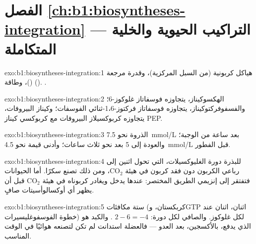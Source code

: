 \section*{الفصل \ref{ch:b1:biosyntheses-integration} --- التراكيب الحيوية والخلية المتكاملة}

\begin{solution}{exo:b1:biosyntheses-integration:1}
هياكل كربونية (من السبل المركزية)، وقدرة مرجعة ()، وطاقة ().
.
\end{solution}

\begin{solution}{exo:b1:biosyntheses-integration:2}
الهكسوكيناز، يتجاوزه فوسفاتاز غلوكوز-6؛ والفسفوفركتوكيناز، يتجاوزه
فوسفاتاز فركتوز-1،6-ثنائي الفوسفات؛ وكيناز البيروفات، يتجاوزه
كربوكسيلاز البيروفات مع كربوكسي كيناز PEP.
\end{solution}

\begin{solution}{exo:b1:biosyntheses-integration:3}
الذروة نحو \qty{7.5}{mmol/L} بعد ساعة من الوجبة؛ والعودة إلى
\qty{5}{} بعد نحو ثلاث ساعات؛ وأدنى قيمة نحو \qty{4.5}{mmol/L} قبل
الفطور.
\end{solution}

\begin{solution}{exo:b1:biosyntheses-integration:4}
للبذرة دورة الغليوكسيلات، التي تحول  اثنين إلى  رباعي
الكربون دون فقد كربون في هيئة $\mathrm{CO_2}$، ومن ذلك  تصنع
سكرًا. أما الحيوانات فتفتقر إلى إنزيمي الطريق المختصر: 
عندها يدخل  ويغادر كربوناه في هيئة $\mathrm{CO_2}$ قبل أن
يظهر أي أوكسالوأسيتات صافٍ.
\end{solution}

\begin{solution}{exo:b1:biosyntheses-integration:5}
ستة مكافئات  (كربكستان، وGTP اثنان،  اثنان عند خطوة
الفوسفوغليسيرات) لكل غلوكوز. والصافي لكل دورة: $2 - 6 = -4$ .
والكبد هو الذي يدفع، بالأكسجين، بعد العدو --- فالعضلة استدانت  لم
تكن لتصنعه هوائيًا في الوقت المناسب.
\end{solution}

